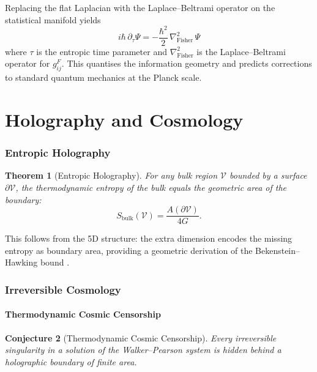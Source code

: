 \documentclass[12pt,a4paper]{article}
\newtheorem{theorem}{Theorem}[section]
\newtheorem{conjecture}[theorem]{Conjecture}
\begin{document}
Replacing the flat Laplacian with the Laplace--Beltrami operator on the
statistical manifold yields
\begin{equation}
  \boxed{
  i\hbar\,\partial_\tau\Psi
  = -\frac{\hbar^2}{2}\,\nabla_{\text{Fisher}}^2\,\Psi
  }
  \label{eq:IG-schrodinger}
\end{equation}
where $\tau$ is the entropic time parameter and $\nabla_{\text{Fisher}}^2$ is
the Laplace--Beltrami operator for $g^F_{ij}$.  This quantises the information
geometry and predicts corrections to standard quantum mechanics at the Planck
scale.

\part{Holography and Cosmology}

\section{Entropic Holography}
\label{sec:holography}

\begin{theorem}[Entropic Holography]
  For any bulk region $\mathcal{V}$ bounded by a surface $\partial\mathcal{V}$,
  the thermodynamic entropy of the bulk equals the geometric area of the
  boundary:
  \begin{equation}
    S_{\text{bulk}}(\mathcal{V}) = \frac{A(\partial\mathcal{V})}{4G} .
    \label{eq:holography}
  \end{equation}
\end{theorem}

This follows from the 5D structure: the extra dimension encodes the missing
entropy as boundary area, providing a geometric derivation of the
Bekenstein--Hawking bound \citep{Bekenstein1973,Hawking1975}.

\section{Irreversible Cosmology}
\label{sec:cosmology}

\subsection{Thermodynamic Cosmic Censorship}

\begin{conjecture}[Thermodynamic Cosmic Censorship]
  Every irreversible singularity in a solution of the Walker--Pearson system
  is hidden behind a holographic boundary of finite area.
\end{conjecture}
\end{document}
